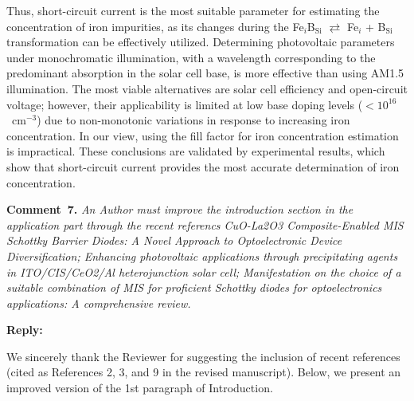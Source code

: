 \documentclass[a4paper,fleqn]{cas-sc}
\begin{document}
\begin{mdframed}
Thus, short-circuit current is the most suitable parameter for estimating the concentration of iron impurities, as its changes during the
Fe$_i$B$_\mathrm{Si}$ $\rightleftarrows$ Fe$_i$ + B$_\mathrm{Si}$ transformation can be effectively utilized.
Determining photovoltaic parameters under monochromatic illumination,
with a wavelength corresponding to the predominant absorption in the solar cell base, is more effective than using AM1.5 illumination.
The most viable alternatives are solar cell efficiency and open-circuit voltage;
however, their applicability is limited at low base doping levels ($<10^{16}$~cm$^{-3}$)
due to non-monotonic variations in response to increasing iron concentration.
In our view, using the fill factor for iron concentration estimation is impractical.
\textcolor[rgb]{1.00,0.07,0.00}{These conclusions are validated by experimental results,
which show that short-circuit current provides the most accurate determination of iron concentration.}
\end{mdframed}

\vspace{1cm}
\noindent
\textcolor[rgb]{0.00,0.50,1.00}{\textbf{Comment~7.}}
\emph{An Author must improve the introduction section in the application part through the recent referencs
CuO-La2O3 Composite-Enabled MIS Schottky Barrier Diodes: A Novel Approach to Optoelectronic Device Diversification;
Enhancing photovoltaic applications through precipitating agents in ITO/CIS/CeO2/Al heterojunction solar cell;
Manifestation on the choice of a suitable combination of MIS for proficient Schottky diodes for optoelectronics applications: A comprehensive review.}






\noindent
\textcolor[rgb]{0.51,0.00,0.00}{\textbf{Reply:}}

We sincerely thank the Reviewer for suggesting the inclusion of recent references (cited as References 2, 3, and 9 in the revised manuscript).
Below, we present an improved version of the 1st paragraph of Introduction.
\end{document}
